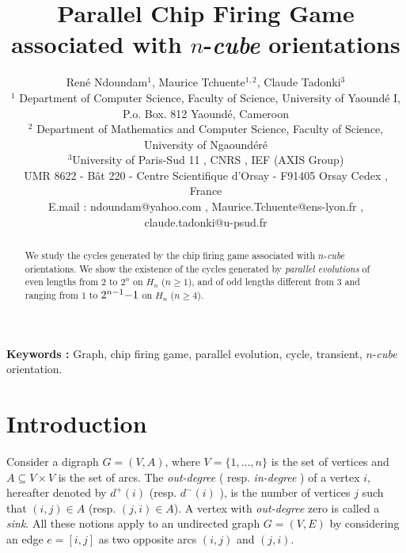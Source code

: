 \documentclass{article}
\begin{document}
\title{\bf Parallel Chip Firing Game associated with $n$-{\em cube} orientations}  
\author{Ren\'e Ndoundam${}^{1}$, Maurice Tchuente${}^{1,2}$, Claude Tadonki${}^{3}$ \\
${}^{1}$ {\small Department of Computer Science, Faculty of Science, 
 University of Yaound\'e I,  } \\
{\small P.o. Box. 812 Yaound\'e, Cameroon} \\
${}^{2}$ {\small Department of Mathematics and Computer Science, Faculty of Science, University of Ngaound\'er\'e } \\
${}^{3}${\small University of Paris-Sud 11 ,  CNRS , IEF (AXIS Group) } \\
        {\small UMR 8622 - B\^at 220 - Centre Scientifique d'Orsay - F91405 Orsay Cedex , France}    \\
{\small E.mail : ndoundam@yahoo.com , Maurice.Tchuente@ens-lyon.fr , claude.tadonki@u-psud.fr } \\
                 } 
\maketitle
\begin{abstract} We study the cycles generated by the chip firing game
 associated with $n$-{\em cube} orientations. We show the existence of the cycles generated by
{\em parallel evolutions} of even lengths from $2$ to $2^n$ on $H_n$ ($n\geq 1$), and of odd lengths different
 from $3$ and ranging from $1$ to $2^{n{\rm -}1}{\rm -}1$ on $H_n$ ($n\geq 4$).
\end{abstract}
{\bf Keywords :}
Graph, chip firing game, parallel evolution, cycle, transient, $n$-{\em cube} orientation.

\pagestyle{myheadings}
\thispagestyle{plain}

\section{Introduction}
Consider a digraph $G=(V,A)$, where $V=\{ 1,...,n\}$ is the set of vertices
and $A\subseteq V\times V$ is the set of arcs. The {\em out-degree} ( resp. {\em in-degree} ) of a
vertex $i$, hereafter denoted by $d^+(i)$ (resp. $d^-(i)$ ), is the number of vertices $j$ such
that $(i,j)\in A$ (resp. $(j,i)\in A$). A vertex
with {\em out-degree} zero is called a {\em sink}. All these notions apply to an
undirected graph $G=(V,E)$ by considering an edge $e=[i,j]$ as two opposite
arcs $(i,j)$ and $(j,i)$.
\end{document}
